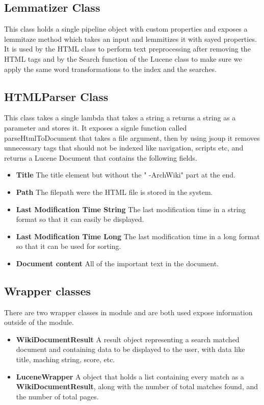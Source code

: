 \documentclass[conference]{IEEEtran}
\begin{document}
{        \subsection{\textbf{Lemmatizer Class}}{This class holds a single pipeline object with custom properties and exposes a lemmitaze method which takes an input and lemmitizes it with sayed properties.
        It is used by the HTML class to perform text preprocessing after removing the HTML tags and by the Search function of the Lucene class to make sure we apply the same word transformations to the index and the searches.}\label{lemmatizer-class}

        \subsection{\textbf{HTMLParser Class}}{This class takes a single lambda that takes a string a returns a string as a parameter and stores it.
        It exposes a signle function called parseHtmlToDocument that takes a file argument, then by using jsoup it removes unnecessary tags that should not be indexed like navigation, scripts etc,
            and returns a Lucene Document that contains the following fields.

            \begin{itemize}
                \item \textbf{Title} The title element but without the " -ArchWiki" part at the end.
                \item \textbf{Path} The filepath were the HTML file is stored in the system.
                \item \textbf{Last Modification Time String} The last modification time in a string format so that it can easily be displayed.
                \item \textbf{Last Modification Time Long} The last modification time in a long format so that it can be used for sorting.
                \item \textbf{Document content} All of the important text in the document.
            \end{itemize}}\label{htmlparser-class}

        \subsection{\textbf{Wrapper classes}}{There are two wrapper classes in module and are both used expose information outside of the module.
            \begin{itemize}
                \item \textbf{WikiDocumentResult} A result object representing a search matched document and containing data to be displayed to the user, with data like title, maching string, score, etc.
                \item \textbf{LuceneWrapper} A object that holds a list containing every match as a \textbf{WikiDocumentResult}, along with the number of total matches found, and the number of total pages.
            \end{itemize}}\label{wrapper-classes}


    }\label{sec:searchengine-module}
\end{document}
